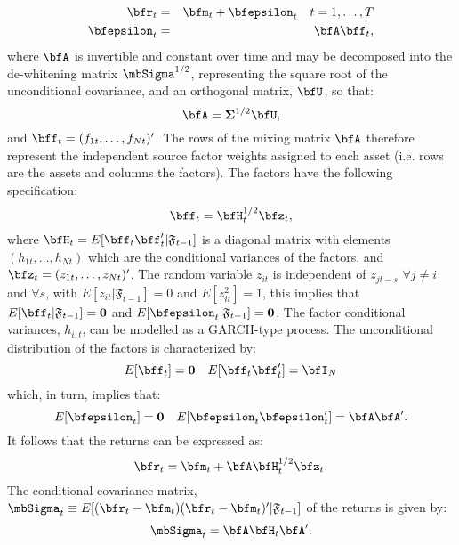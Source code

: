 \begin{eqnarray}
\bfr_t & = & \bfm_t + \bfepsilon_t \quad t = 1,\ldots, T \\
\bfepsilon_t & = & \bfA \bff_t,
\end{eqnarray}
where \( \bfA \) is invertible and constant over time and may be decomposed into
the de-whitening matrix $\mbSigma^{1/2}$, representing the square root of the
unconditional covariance, and an orthogonal matrix, $\bfU$, so that:
\begin{equation}\label{eq:matrix_A}
\bfA = \mathbf{\Sigma}^{1/2}\bfU,
\end{equation}
and \(\bff_t = (f_{1t},\ldots,f_{Nt})'\). The rows of the mixing matrix \(\bfA \)
therefore represent the independent source factor weights assigned to each asset
(i.e. rows are the assets and columns the factors). The factors have the following
specification:
\begin{equation}
    \bff_{t} = \bfH_t^{1/2} \bfz_t,
\end{equation}
where \( \bfH_t = E[\bff_t \bff_t' | \mathfrak{F}_{t-1}] \) is a diagonal matrix
with elements \((h_{1t},\ldots,h_{Nt} )\) which are the conditional variances of
the factors, and \(\bfz_t = (z_{1t},\ldots,z_{Nt})' \). The random variable \( z_{it} \)
is independent of \( z_{jt-s} \) \(\forall j \neq i \) and \( \forall s\),
with \(E[z_{it}|\mathfrak{F}_{t-1}]=0\) and \( E[z_{it}^2]=1 \), this implies
that \( E[\bff_t|\mathfrak{F}_{t-1}] = \mathbf{0} \)
and \(E[\bfepsilon_t|\mathfrak{F}_{t-1}] = \mathbf{0}\). The factor conditional
variances, \(h_{i,t}\), can be modelled as a GARCH-type process. The unconditional
distribution of the factors is characterized by:
\begin{equation}\label{eq:factor_moments}
E[\bff_t] = \mathbf{0} \quad  E[\bff_t\bff_t'] = \bfI_N
\end{equation}
which, in turn, implies that:
\begin{equation}
E[\bfepsilon_t] = \mathbf{0} \quad E[\bfepsilon_t\bfepsilon_t'] = \bfA \bfA'.
\end{equation}
It follows that the returns can be expressed as:
\begin{equation}\label{eq:returns_model}
\bfr_t = \bfm_t + \bfA \bfH_t^{1/2} \bfz_t.
\end{equation}
The conditional covariance matrix, \( \mbSigma_t \equiv E[(\bfr_t -\bfm_t)(\bfr_t - \bfm_t)'|\mathfrak{F}_{t-1}] \)
of the returns is given by:
\begin{equation}\label{eq:ifacdcov}
    \mbSigma_t  =  \bfA \bfH_t \bfA'.
\end{equation}
